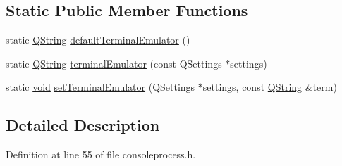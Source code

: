 \subsection*{\-Static \-Public \-Member \-Functions}
\begin{DoxyCompactItemize}
\item 
static \hyperlink{group___u_a_v_objects_plugin_gab9d252f49c333c94a72f97ce3105a32d}{\-Q\-String} \hyperlink{class_utils_1_1_console_process_ac1c6c784e1cc19c6842cec0f5bc00162}{default\-Terminal\-Emulator} ()
\item 
static \hyperlink{group___u_a_v_objects_plugin_gab9d252f49c333c94a72f97ce3105a32d}{\-Q\-String} \hyperlink{class_utils_1_1_console_process_a157017d2d631838fd521c9c69efd04d2}{terminal\-Emulator} (const \-Q\-Settings $\ast$settings)
\item 
static \hyperlink{group___u_a_v_objects_plugin_ga444cf2ff3f0ecbe028adce838d373f5c}{void} \hyperlink{class_utils_1_1_console_process_a38d5ca0fa3b66525512debc37e538c9c}{set\-Terminal\-Emulator} (\-Q\-Settings $\ast$settings, const \hyperlink{group___u_a_v_objects_plugin_gab9d252f49c333c94a72f97ce3105a32d}{\-Q\-String} \&term)
\end{DoxyCompactItemize}


\subsection{\-Detailed \-Description}


\-Definition at line 55 of file consoleprocess.\-h.



